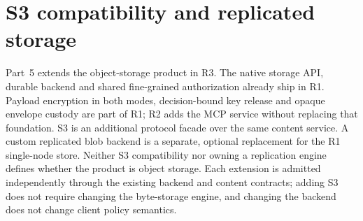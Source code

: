 \section{S3 compatibility and replicated storage}\label{sec:storage}
Part~5 extends the object-storage product in R3. The native storage API, durable backend and shared fine-grained authorization already ship in R1. Payload encryption in both modes, decision-bound key release and opaque envelope custody are part of R1; R2 adds the MCP service without replacing that foundation. S3 is an additional protocol facade over the same content service. A custom replicated blob backend is a separate, optional replacement for the R1 single-node store. Neither S3 compatibility nor owning a replication engine defines whether the product is object storage. Each extension is admitted independently through the existing backend and content contracts; adding S3 does not require changing the byte-storage engine, and changing the backend does not change client policy semantics.

